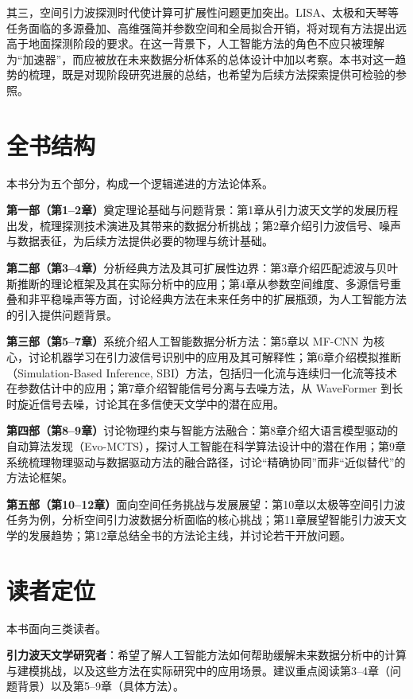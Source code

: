 其三，空间引力波探测时代使计算可扩展性问题更加突出。LISA、太极和天琴等任务面临的多源叠加、高维强简并参数空间和全局拟合开销，将对现有方法提出远高于地面探测阶段的要求。在这一背景下，人工智能方法的角色不应只被理解为“加速器”，而应被放在未来数据分析体系的总体设计中加以考察。本书对这一趋势的梳理，既是对现阶段研究进展的总结，也希望为后续方法探索提供可检验的参照。

\section*{全书结构}

本书分为五个部分，构成一个逻辑递进的方法论体系。

\textbf{第一部（第1--2章）}奠定理论基础与问题背景：第1章从引力波天文学的发展历程出发，梳理探测技术演进及其带来的数据分析挑战；第2章介绍引力波信号、噪声与数据表征，为后续方法提供必要的物理与统计基础。

\textbf{第二部（第3--4章）}分析经典方法及其可扩展性边界：第3章介绍匹配滤波与贝叶斯推断的理论框架及其在实际分析中的应用；第4章从参数空间维度、多源信号重叠和非平稳噪声等方面，讨论经典方法在未来任务中的扩展瓶颈，为人工智能方法的引入提供问题背景。

\textbf{第三部（第5--7章）}系统介绍人工智能数据分析方法：第5章以 MF-CNN 为核心，讨论机器学习在引力波信号识别中的应用及其可解释性；第6章介绍模拟推断（Simulation-Based Inference, SBI）方法，包括归一化流与连续归一化流等技术在参数估计中的应用；第7章介绍智能信号分离与去噪方法，从 WaveFormer 到长时旋近信号去噪，讨论其在多信使天文学中的潜在应用。

\textbf{第四部（第8--9章）}讨论物理约束与智能方法融合：第8章介绍大语言模型驱动的自动算法发现（Evo-MCTS），探讨人工智能在科学算法设计中的潜在作用；第9章系统梳理物理驱动与数据驱动方法的融合路径，讨论“精确协同”而非“近似替代”的方法论框架。

\textbf{第五部（第10--12章）}面向空间任务挑战与发展展望：第10章以太极等空间引力波任务为例，分析空间引力波数据分析面临的核心挑战；第11章展望智能引力波天文学的发展趋势；第12章总结全书的方法论主线，并讨论若干开放问题。

\section*{读者定位}

本书面向三类读者。

\textbf{引力波天文学研究者}：希望了解人工智能方法如何帮助缓解未来数据分析中的计算与建模挑战，以及这些方法在实际研究中的应用场景。建议重点阅读第3--4章（问题背景）以及第5--9章（具体方法）。


